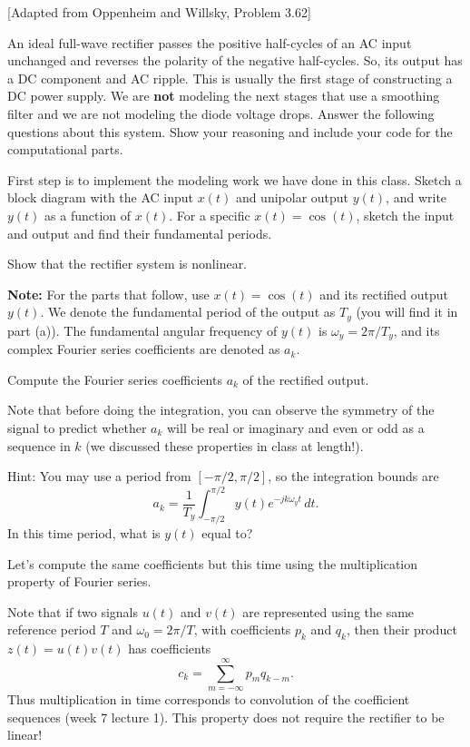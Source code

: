 \documentclass{ee102_pset}
\author{\rule{3cm}{0.4pt}} %
\begin{document}
[Adapted from Oppenheim and Willsky, Problem 3.62]

An ideal full-wave rectifier passes the positive half-cycles of an AC input unchanged and reverses the polarity of the negative half-cycles. So, its output has a DC component and AC ripple. This is usually the first stage of constructing a DC
power supply. We are \textbf{not} modeling the next stages that use a smoothing filter and we are not modeling the diode voltage drops.
Answer the following questions about this system. Show your reasoning and include your code for the computational parts.

\problempart[10 points] First step is to implement the modeling work we have done in this class. Sketch a block diagram with the AC input $x(t)$ and unipolar output $y(t)$, and write $y(t)$ as a function of $x(t)$. For a specific $x(t)=\cos(t)$, sketch the
input and output and find their fundamental periods. 

\problempart[5 points] Show that the rectifier system is nonlinear.

\textbf{Note:} For the parts that follow, use $x(t)=\cos(t)$ and its rectified output $y(t)$. We denote the fundamental period of the output as $T_y$ (you will find it in part (a)). The
fundamental angular frequency of $y(t)$ is $\omega_y=2\pi/T_y$, and its complex Fourier series coefficients are denoted as $a_k$.

\problempart[25 points] Compute the Fourier series coefficients $a_k$ of the rectified output.

Note that before doing the integration, you can observe the symmetry of the signal to predict whether $a_k$ will be real or imaginary and even or odd as a sequence in $k$ (we discussed these properties in class at length!).

Hint: You may use a period from
$[-\pi/2,\pi/2]$, so the integration bounds are
\[
a_k=\frac{1}{T_y}\int_{-\pi/2}^{\pi/2}
y(t)e^{-jk\omega_y t}\,dt.
\]
In this time period, what is $y(t)$ equal to?

\problempart[20 points] Let's compute the same coefficients but this time using the multiplication property of Fourier series. 

Note that if two signals $u(t)$ and $v(t)$ are represented using the same reference
period $T$ and $\omega_0=2\pi/T$, with coefficients $p_k$ and $q_k$, then
their product $z(t)=u(t)v(t)$ has coefficients
\[
c_k=\sum_{m=-\infty}^{\infty}p_m q_{k-m}.
\]
Thus multiplication in time corresponds to convolution of the coefficient
sequences (week 7 lecture 1). This property does not require the rectifier to be linear!
\end{document}
